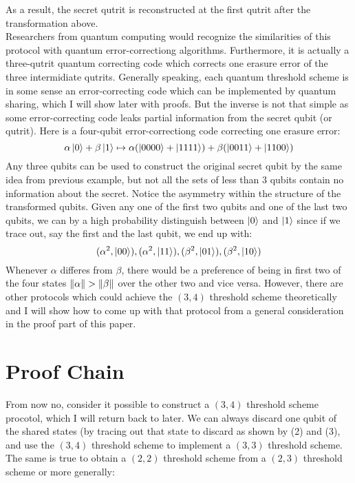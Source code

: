 \documentclass[12pt]{article}
\begin{document}
As a result, the secret qutrit is reconstructed at the first qutrit after the transformation above.\\
Researchers from quantum computing would recognize the similarities of this protocol with quantum error-correctiong algorithms. Furthermore, it is actually a three-qutrit quantum correcting code which corrects one erasure error of the three intermidiate qutrits. Generally speaking, each quantum threshold scheme is in some sense an error-correcting code which can be implemented by quantum sharing, which I will show later with proofs. But the inverse is not that simple as some error-correcting code leaks partial information from the secret qubit (or qutrit). Here is a four-qubit error-correctiong code correcting one erasure error:
\begin{equation*}
	\alpha \ket{0} + \beta \ket{1} \mapsto \alpha ( \ket{0000} + \ket{1111}) + \beta ( \ket{0011} + \ket{1100})
\end{equation*}
Any three qubits can be used to construct the original secret qubit by the same idea from previous example, but not all the sets of less than $3$ qubits contain no information about the secret. Notice the asymmetry within the structure of the transformed qubits. Given any one of the first two qubits and one of the last two qubits, we can by a high probability distinguish between $\ket{0}$ and $\ket{1}$ since if we trace out, say the first and the last qubit, we end up with:
\begin{equation}
	( \alpha ^2, \ket{00}), ( \alpha ^2, \ket{11}), ( \beta ^2, \ket{01}), ( \beta ^2, \ket{10})
\end{equation}
Whenever $ \alpha $ differes from $ \beta $, there would be a preference of being in first two of the four states $ \norm{\alpha} > \norm{\beta} $ over the other two and vice versa.
However, there are other protocols which could achieve the $(3,4)$ threshold scheme theoretically and I will show how to come up with that protocol from a general consideration in the proof part of this paper.\\
\section{Proof Chain}
From now no, consider it possible to construct a $(3, 4)$ threshold scheme procotol, which I will return back to later. We can always discard one qubit of the shared states (by tracing out that state to discard as shown by (2) and (3), and use the $(3,4)$ threshold scheme to implement a $(3, 3)$ threshold scheme. The same is true to obtain a $(2,2)$ threshold scheme from a $(2, 3)$ threshold scheme or more generally:
\end{document}
